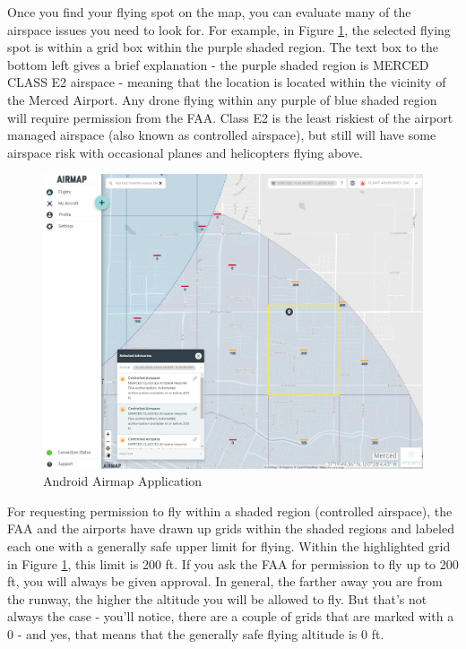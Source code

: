 \documentclass[
  12pt,
]{book}
\begin{document}
Once you find your flying spot on the map, you can evaluate many of the airspace issues you need to look for. For example, in Figure \ref{fig:airmap-web}, the selected flying spot is within a grid box within the purple shaded region.
The text box to the bottom left gives a brief explanation - the purple shaded region is MERCED CLASS E2 airspace - meaning that the location is located within the vicinity of the Merced Airport. Any drone flying within any purple of blue shaded region will require permission from the FAA. Class E2 is the least riskiest of the airport managed airspace (also known as controlled airspace), but still will have some airspace risk with occasional planes and helicopters flying above.

\begin{figure}

{\centering \includegraphics[width=0.85\linewidth]{images/Airmap-webpage} 

}

\caption{Android Airmap Application}\label{fig:airmap-web}
\end{figure}

For requesting permission to fly within a shaded region (controlled airspace), the FAA and the airports have drawn up grids within the shaded regions and labeled each one with a generally safe upper limit for flying. Within the highlighted grid in Figure \ref{fig:airmap-web}, this limit is 200 ft. If you ask the FAA for permission to fly up to 200 ft, you will always be given approval. In general, the farther away you are from the runway, the higher the altitude you will be allowed to fly. But that's not always the case - you'll notice, there are a couple of grids that are marked with a 0 - and yes, that means that the generally safe flying altitude is 0 ft.
\end{document}
